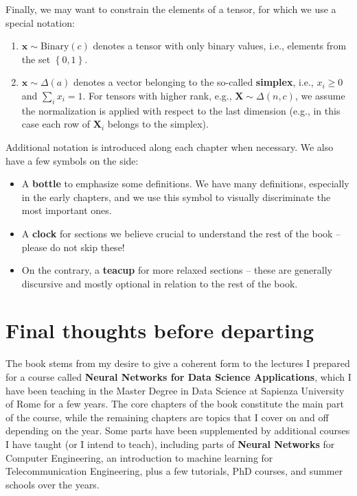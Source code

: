 %
Finally, we may want to constrain the elements of a tensor, for which we use a special notation:
%
\begin{enumerate}
    \item $\mathbf{x} \sim \text{Binary}(c)$ denotes a tensor with only binary values, i.e., elements from the set $\left\{0,1\right\}$.
    \item $\mathbf{x} \sim \Delta(a)$ denotes a vector belonging to the so-called \textbf{simplex}, i.e., $x_i \ge 0$ and $\sum_i x_i = 1$. For tensors with higher rank, e.g., $\mathbf{X} \sim \Delta(n,c)$, we assume the normalization is applied with respect to the last dimension (e.g., in this case each row of $\mathbf{X}_i$ belongs to the simplex).
\end{enumerate}
%
Additional notation is introduced along each chapter when necessary. We also have a few symbols on the side: 

\begin{itemize}
\item  \addbottle A \textbf{bottle} to emphasize some definitions. We have many definitions, especially in the early chapters, and we use this symbol to visually discriminate the most important ones.
\item \addclock A \textbf{clock} for sections we believe crucial to understand the rest of the book -- please do not skip these!
\item \addteacup On the contrary, a \textbf{teacup} for more relaxed sections -- these are generally discursive and mostly optional in relation to the rest of the book.
\end{itemize}

\section*{Final thoughts before departing}

The book stems from my desire to give a coherent form to the lectures I prepared for a course called \textbf{Neural Networks for Data Science Applications}, which I have been teaching in the Master Degree in Data Science at Sapienza University of Rome for a few years. The core chapters of the book constitute the main part of the course, while the remaining chapters are topics that I cover on and off depending on the year. Some parts have been supplemented by additional courses I have taught (or I intend to teach), including parts of \textbf{Neural Networks} for Computer Engineering, an introduction to machine learning for Telecommunication Engineering, plus a few tutorials, PhD courses, and summer schools over the years.

